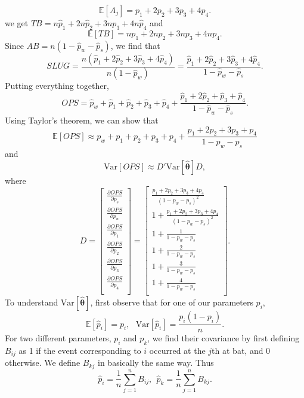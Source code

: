 \documentclass [52pt] {article}
\newcommand{\Exp}{\mathbb{E}}
\newcommand{\var}{\text{Var}}
\begin{document}
\[\Exp[A_j] = p_1+2p_2+3p_3+4p_4.\]
we get $TB= n\hat{p}_1 + 2n\hat{p}_2+3np_3+4n\hat{p}_4$ and 
\[\Exp[TB] = np_1+2np_2+3np_3+4np_4.\]
Since $AB = n(1-\hat{p}_w-\hat{p}_s)$, we find that 
\[SLUG = \frac{n(\hat{p}_1+2\hat{p}_2+3\hat{p}_3+4\hat{p}_4)}{n(1-\hat{p}_w)}=\frac{\hat{p}_1+2\hat{p}_2+3\hat{p}_3+4\hat{p}_4}{1-\hat{p}_w-\hat{p}_s}.\]
Putting everything together, 
\[OPS = \hat{p}_w+\hat{p}_1 + \hat{p}_2+\hat{p}_3+\hat{p}_4+\frac{\hat{p}_1+2\hat{p}_2+\hat{p}_3+\hat{p}_4}{1-\hat{p}_w-\hat{p}_s}.\]
Using Taylor's theorem, we can show that 
\begin{equation}\label{eq : expOPS}
\Exp[OPS] \approx  p_w+p_1 + p_2+p_3+p_4+\frac{p_1+2p_2+3p_3+p_4}{1-p_w-p_s}
\end{equation}
and
\begin{equation}\label{eq : varOPS}
\var[OPS] \approx D'\var[\hat{\pmb{\theta}}]D, 
\end{equation}
where
\[D = \begin{bmatrix}\frac{\partial OPS}{\partial p_s}\\[0.5em]
 \frac{\partial OPS}{\partial p_w}\\[0.5em]
\frac{\partial OPS}{\partial p_1}\\[0.5em]
\frac{\partial OPS}{\partial p_2}\\[0.5em] \frac{\partial OPS}{\partial p_3}\\[0.5em]
\frac{\partial OPS}{\partial p_4}\\\end{bmatrix}
=\begin{bmatrix}
\frac{p_1+2p_2+3p_3+4p_4}{(1-p_w-p_s)^2}\\[0.5em]
1+\frac{p_1+2p_2+3p_3+4p_4}{(1-p_w-p_s)^2}\\[0.5em]
1+\frac{1}{1-p_w-p_s}\\[0.5em]
1+\frac{2}{1-p_w-p_s}\\[0.5em]
1+\frac{3}{1-p_w-p_s}\\[0.5em]
1+\frac{4}{1-p_w-p_s}\\
\end{bmatrix}.\]
To understand $\var[\hat{\pmb{\theta}}]$, first observe that for one of our parameters $p_i$, 
\[\Exp[\hat{p}_i] =p_i,\:\:\:\var[\hat{p}_i]=\frac{p_i(1-p_i)}{n}.\]  
For two different parameters, $p_i$ and $p_k$, we find their covariance by first defining $B_{ij}$ as 1 if the event corresponding to $i$ occurred at the $j$th at bat, and 0 otherwise.  We define $B_{kj}$ in basically the same way.  Thus
\[\hat{p}_{i} = \frac{1}{n}\sum_{j=1}^n B_{ij},\:\:\hat{p}_{k} = \frac{1}{n}\sum_{j=1}^n B_{kj}.\]
\end{document}

